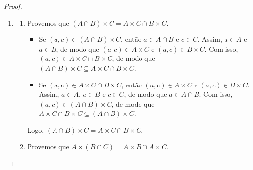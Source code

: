 \begin{proof}
\begin{enumerate}[leftmargin=*, align=left, label=\textbf{(\alph*)}]
\begin{enumerate}[label=\roman*.]
                        \begin{itemize}
                            \item[($\subseteq$)] Se $(a,b) \in A \times (B \cup C)$, então $a \in A$ e $b \in B \cup C$. Assim, $b \in B$ ou $b \in C$. Se $b \in B$, então $(a,b) \in A \times B$, e se $b \in C$, então $(a,b) \in A \times C$. Com isso, $(a,b) \in A \times B \cup A \times C$, de modo que $A \times (B \cup C) \subseteq A \times B \cup A \times C$.
                            \item[($\supseteq$)] Se $(a,b) \in A \times B \cup A \times C$, então $(a,b) \in A \times B$ ou $(a,b) \in A \times C$. No primeiro caso, $a \in A$ e $b \in B$, e no segundo caso, $a \in A$ e $b \in C$. Em ambos os casos, $a \in A$ e $b \in B \cup C$, de modo que $(a,b) \in A \times (B \cup C)$. Com isso, $A \times B \cup A \times C \subseteq A \times (B \cup C)$.
                        \end{itemize}
                    Logo, $A \times (B \cup C) = A \times B \cup A \times C$.
                \end{enumerate}
            Logo, vale a distributividade entre $\times$ e $\cup$. \blackproof
            \item
                \begin{enumerate}[label=\roman*.]
                    \item Provemos que $(A \cap B) \times C = A \times C \cap B \times C$.
                        \begin{itemize}
                            \item[($\subseteq$)] Se $(a,c) \in (A \cap B) \times C$, então $a \in A \cap B$ e $c \in C$. Assim, $a \in A$ e $a \in B$, de modo que $(a,c) \in A \times C$ e $(a,c) \in B \times C$. Com isso, $(a,c) \in A \times C \cap B \times C$, de modo que $(A \cap B) \times C \subseteq A \times C \cap B \times C$.
                            \item[($\supseteq$)] Se $(a,c) \in A \times C \cap B \times C$, então $(a,c) \in A \times C$ e $(a,c) \in B \times C$. Assim, $a \in A$, $a \in B$ e $c \in C$, de modo que $a \in A \cap B$. Com isso, $(a,c) \in (A \cap B) \times C$, de modo que $A \times C \cap B \times C \subseteq (A \cap B) \times C$.
                        \end{itemize}
                    Logo, $(A \cap B) \times C = A \times C \cap B \times C$.
                    \item Provemos que $A \times (B \cap C) = A \times B \cap A \times C$.

\end{enumerate}
\end{enumerate}
\end{proof}
